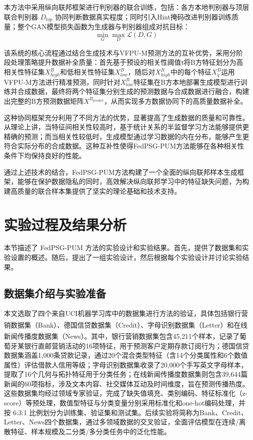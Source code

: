 本方法中采用纵向联邦框架进行判别器的联合训练，包括：各方本地判别器与顶层联合判别器 $D_{top}$ 协同判断数据真实程度；同时引入Hint掩码改进判别器训练质量；整个GAN模型损失函数为生成器与判别器组成对抗目标：
\begin{equation}
\min_{G}\max_{D}\mathcal{L}(D,G)
\end{equation}

该系统的核心流程通过结合生成技术与VFPU-M预测方法的互补优势，采用分阶段处理策略提升数据补全质量：首先基于预设的相关性阈值τ将B方特征划分为高相关性特征集$X^B_{high}$和低相关性特征集$X^B_{low}$，随后对$X^B_{high}$中的每个特征$X^B_q$运用VFPU-M方法进行精准预测，同时针对$X^B_{low}$特征集在B方本地部署生成模型进行训练并合成数据，最终将两个特征集分别生成的预测数据与合成数据进行融合，构建出完整的B方预测数据矩阵$X^{B_{predict}}$，从而实现多方数据协同下的高质量数据补全。

这种协同框架充分利用了不同方法的优势，显著提高了生成数据的质量和可靠性。从理论上讲，当特征间相关性较高时，基于统计关系的半监督学习方法能够提供更精确的预测；而当相关性较低时，生成模型通过学习数据的内在分布，能够产生更符合实际分布的合成数据。这种互补性使得FedPSG-PUM方法能够在各种相关性条件下均保持良好的性能。

通过上述技术的结合，FedPSG-PUM方法构建了一个全面的纵向联邦样本生成框架，能够在保护数据隐私的同时，高效解决纵向联邦学习中的特征缺失问题，为构建高质量的联合样本集提供了坚实的理论基础和技术支持。


\section{实验过程及结果分析}
本节描述了 FedPSG-PUM 方法的实验设计和实验结果。首先，提供了数据集和实验设置的概述。随后，提出了一组实验设计，然后根据每个实验设计并讨论实验结果。
\subsection{数据集介绍与实验准备} \label{subsec:data_experiment}
本文选取了四个来自UCI机器学习库中的数据集进行方法的验证，具体包括银行营销数据集（Bank）、德国信贷数据集（Credit）、字母识别数据集（Letter）\textsuperscript{\cite{serbian}}和在线新闻传播度数据集（News）\textsuperscript{\cite{news}}。其中，银行营销数据集包含45,211个样本，记录了葡萄牙某银行直邮营销活动的16项特征，用于预测客户定期存款订阅行为；德国信贷数据集涵盖1,000条贷款记录，通过20个混合类型特征（含14个分类属性和6个数值属性）评估借款人信用等级；字母识别数据集收录了20,000个手写英文字母样本，提取了16个几何与拓扑特征用于分类任务；在线新闻传播度数据集则包含39,644篇新闻的60项指标，涉及文本内容、社交媒体互动及时间维度，旨在预测传播热度。这些数据集均经过领域专家验证，完成了缺失值填充、类别编码、特征标准化（z-score）等预处理，数值型特征与分类变量分别采用标准化和one-hot编码处理，并按 6:3:1 比例划分为训练集、验证集和测试集。后续实验将简称为Bank、Credit、Letter、News四个数据集，通过多领域数据的交叉验证，全面评估模型在连续/离散特征、样本规模及二分类/多分类任务中的泛化性能。


